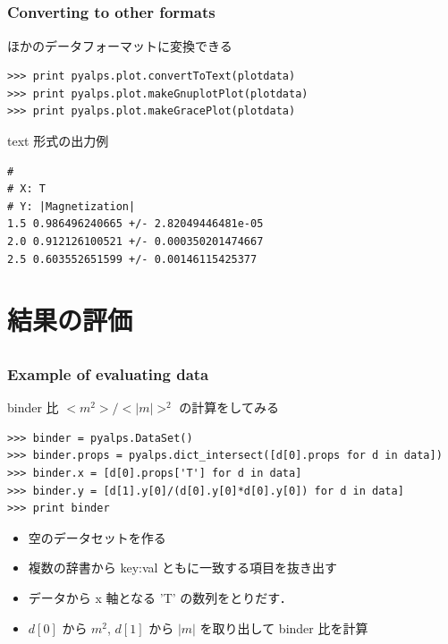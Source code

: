 \subsection*{\redm\whiteb\greenb}
\begin{frame}[t,fragile]
\frametitle{Converting to other formats}
ほかのデータフォーマットに変換できる
\begin{lstlisting}
>>> print pyalps.plot.convertToText(plotdata)
>>> print pyalps.plot.makeGnuplotPlot(plotdata)
>>> print pyalps.plot.makeGracePlot(plotdata)
\end{lstlisting}

text 形式の出力例
\begin{lstlisting}
# 
# X: T
# Y: |Magnetization|
1.5	0.986496240665 +/- 2.82049446481e-05
2.0	0.912126100521 +/- 0.000350201474667
2.5	0.603552651599 +/- 0.00146115425377
\end{lstlisting}
\end{frame}

\section{結果の評価}

\subsection*{\redm\whiteb\greenb}
\begin{frame}[t,fragile]
\frametitle{Example of evaluating data}
binder 比 $<m^2>/<|m|>^2$ の計算をしてみる
\begin{lstlisting}
>>> binder = pyalps.DataSet()
>>> binder.props = pyalps.dict_intersect([d[0].props for d in data])
>>> binder.x = [d[0].props['T'] for d in data]
>>> binder.y = [d[1].y[0]/(d[0].y[0]*d[0].y[0]) for d in data]
>>> print binder
\end{lstlisting}
\begin{itemize}
\item 空のデータセットを作る
\item 複数の辞書から key:val ともに一致する項目を抜き出す
\item データから x 軸となる 'T' の数列をとりだす．
\item $d[0]$ から $m^2$, $d[1]$ から $|m|$ を取り出して binder 比を計算
\end{itemize}
\end{frame}


